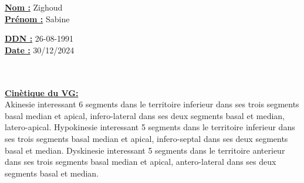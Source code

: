\documentclass[12pt,a4paper]{article}%
\begin{document}
%
\normalsize%
\begin{minipage}{0.5\linewidth}%
\textbf{\underline{Nom :}} \hspace{1cm} Zighoud%
\\%
\textbf{\underline{Prénom :}} \hspace{1cm} Sabine%
\\%
\end{minipage}%
\begin{minipage}{0.5\linewidth}%
\textbf{\underline{DDN :}} \hspace{1cm} 26-08-1991%
\\%
\textbf{\underline{Date :}} \hspace{1cm} 30/12/2024%
\\%
\end{minipage}%
\hspace{\textwidth}%
\\%
\\%
%
\vspace*{\baselineskip}%
\textbf{\ul{Cinètique du VG:}}%
\\%
Akinesie interessant 6 segments dans le territoire inferieur dans ses trois segments basal median et apical, infero{-}lateral dans ses deux segments basal et median, latero{-}apical. Hypokinesie interessant 5 segments dans le territoire inferieur dans ses trois segments basal median et apical, infero{-}septal dans ses deux segments basal et median. Dyskinesie interessant 5 segments dans le territoire anterieur dans ses trois segments basal median et apical, antero{-}lateral dans ses deux segments basal et median.%
\\%
\\%
\end{document}
